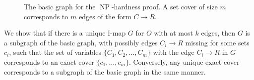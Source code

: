 \documentclass{elsarticle}%
\DeclareMathOperator{\NP}{\mathbf{\mathrm{NP}}}
\begin{document}
\begin{figure}[htbp] %
   \centering
   \caption{The basic graph for the $\NP$-hardness proof.
     A set cover of size $m$ corresponds to $m$ edges of the form $C \rightarrow R$.}
   \label{fig:basic}
\end{figure}
We show
that if there is a unique I-map $G$ for $O$ with at most $k$ edges, then $G$ is a subgraph
of the basic graph, with possibly edges $C_{i}\rightarrow R$
missing for some sets $c_{i}$, such that the set of variables $\{C_{1},C_{2},\ldots,C_m\}$ with the edge $C%
_{i}\rightarrow R$ in $G$ corresponds to an exact cover $\{c_{1},\ldots,c_{m}%
\}$. Conversely, any unique exact cover corresponds to a subgraph of the basic
graph in the same manner. %
\end{document}
